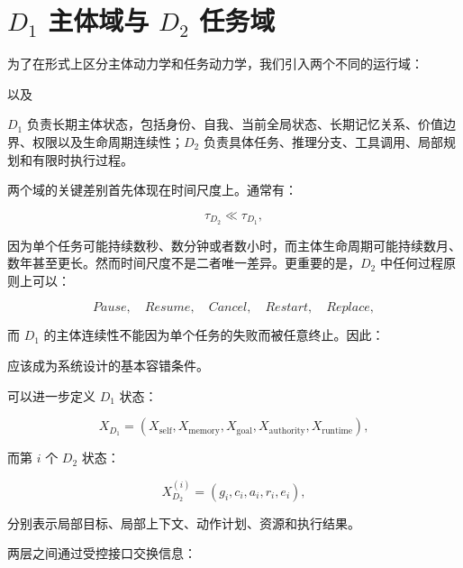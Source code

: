 \section{$D_1$ 主体域与 $D_2$ 任务域}

为了在形式上区分主体动力学和任务动力学，我们引入两个不同的运行域：

\begin{statementbox}
\centering
{}
\end{statementbox}

以及

\begin{statementbox}
\centering
{}
\end{statementbox}

$D_1$ 负责长期主体状态，包括身份、自我、当前全局状态、长期记忆关系、价值边界、权限以及生命周期连续性；$D_2$ 负责具体任务、推理分支、工具调用、局部规划和有限时执行过程。

两个域的关键差别首先体现在时间尺度上。通常有：

\[
\tau_{D_2}
\ll
\tau_{D_1},
\]

因为单个任务可能持续数秒、数分钟或者数小时，而主体生命周期可能持续数月、数年甚至更长。然而时间尺度不是二者唯一差异。更重要的是，$D_2$ 中任何过程原则上可以：

\[
Pause,
\quad
Resume,
\quad
Cancel,
\quad
Restart,
\quad
Replace,
\]

而 $D_1$ 的主体连续性不能因为单个任务的失败而被任意终止。因此：

\begin{statementbox}
\centering
{}
\end{statementbox}

应该成为系统设计的基本容错条件。

可以进一步定义 $D_1$ 状态：

\[
X_{D_1}
=
(
X_{\mathrm{self}},
X_{\mathrm{memory}},
X_{\mathrm{goal}},
X_{\mathrm{authority}},
X_{\mathrm{runtime}}
),
\]

而第 $i$ 个 $D_2$ 状态：

\[
X_{D_2}^{(i)}
=
(
g_i,
c_i,
a_i,
r_i,
e_i
),
\]

分别表示局部目标、局部上下文、动作计划、资源和执行结果。

两层之间通过受控接口交换信息：

